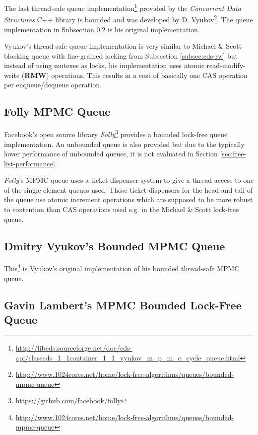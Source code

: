 	The last thread-safe queue implementation\footnote{\url{http://libcds.sourceforge.net/doc/cds-api/classcds\_1\_1container\_1\_1\_vyukov\_m\_p\_m\_c\_cycle\_queue.html}} provided by the \textit{Concurrent Data Structures} C++ library is bounded and was developed by D. Vyukov\footnote{\url{http://www.1024cores.net/home/lock-free-algorithms/queues/bounded-mpmc-queue}}. The queue implementation in Subsection \ref{subsec:vyukov} is his original implementation.
	
	Vyukov's thread-safe queue implementation is very similar to Michael \& Scott blocking queue with fine-grained locking from Subsection \ref{subsec:cds-rw} but instead of using mutexes as locks, his implementation uses atomic read-modify-write (\textbf{RMW}) operations. This results in a cost of basically one CAS operation per enqueue/dequeue operation.

\subsection[Folly MPMC Queue]{Folly MPMC Queue} \label{subsec:folly-mpmc}

	Facebook's open source library \textit{Folly}\footnote{\url{https://github.com/facebook/folly}} provides a bounded lock-free queue implementation. An unbounded queue is also provided but due to the typically lower performance of unbounded queues, it is not evaluated in Section \ref{sec:free-list-performance}.
	
	\textit{Folly}'s MPMC queue uses a ticket dispenser system to give a thread access to one of the single-element queues used. Those ticket dispensers for the head and tail of the queue use atomic increment operations which are supposed to be more robust to contention than CAS operations used e.g. in the Michael \& Scott lock-free queue.

\subsection[Dmitry Vyukov's MPMC Queue]{Dmitry Vyukov's Bounded MPMC Queue} \label{subsec:vyukov}

	This\footnote{\url{http://www.1024cores.net/home/lock-free-algorithms/queues/bounded-mpmc-queue}} is Vyukov's original implementation of his bounded thread-safe MPMC queue.

\subsection[Gavin Lambert's MPMC Queue]{Gavin Lambert's MPMC Bounded Lock-Free Queue} \label{subsec:lampert}

